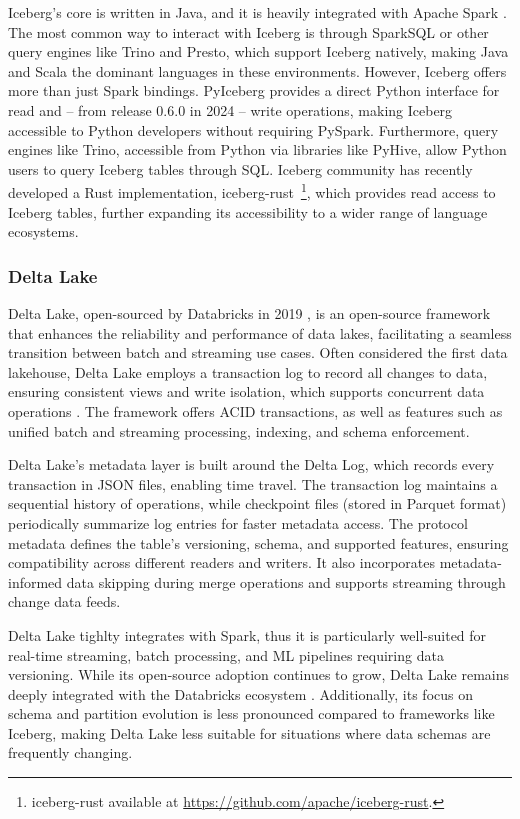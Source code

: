 Iceberg's core is written in Java, and it is heavily integrated with Apache Spark \cite{IcebergNewHadoop,iceberg_tech_docs}.  The most common way to interact with Iceberg is through SparkSQL or other query engines like Trino and Presto, which support Iceberg natively, making Java and Scala the dominant languages in these environments.  However, Iceberg offers more than just Spark bindings. PyIceberg \cite{PyIceberg} provides a direct Python interface for read and -- from release 0.6.0 in 2024 -- write operations, making Iceberg accessible to Python developers without requiring PySpark.  Furthermore, query engines like Trino, accessible from Python via libraries like PyHive, allow Python users to query Iceberg tables through \gls{SQL}. Iceberg community has recently developed a Rust implementation, iceberg-rust~\footnote{iceberg-rust available at \url{https://github.com/apache/iceberg-rust}.}, which provides read access to Iceberg tables, further expanding its accessibility to a wider range of language ecosystems.



\subsubsection*{Delta Lake}
Delta Lake, open-sourced by Databricks in 2019 \cite{armbrustDeltaLakeHighperformance2020}, is an open-source framework that enhances the reliability and performance of data lakes, facilitating a seamless transition between batch and streaming use cases. Often considered the first data lakehouse, Delta Lake employs a transaction log to record all changes to data, ensuring consistent views and write isolation, which supports concurrent data operations \cite{deltalake_tech_docs}. The framework offers \gls{ACID} transactions, as well as features such as unified batch and streaming processing, indexing, and schema enforcement.

Delta Lake's metadata layer is built around the Delta Log, which records every transaction in JSON files, enabling time travel. The transaction log maintains a sequential history of operations, while checkpoint files (stored in Parquet format) periodically summarize log entries for faster metadata access. The protocol metadata defines the table's versioning, schema, and supported features, ensuring compatibility across different readers and writers. It also incorporates metadata-informed data skipping during merge operations and supports streaming through change data feeds.

Delta Lake tighlty integrates with Spark, thus it is particularly well-suited for real-time streaming, batch processing, and \gls{ML} pipelines requiring data versioning. While its open-source adoption continues to grow, Delta Lake remains deeply integrated with the Databricks ecosystem \cite{jainAnalyzingComparingLakehouse2023,comparison2_medium_recent}. Additionally, its focus on schema and partition evolution is less pronounced compared to frameworks like Iceberg, making Delta Lake less suitable for situations where data schemas are frequently changing.

